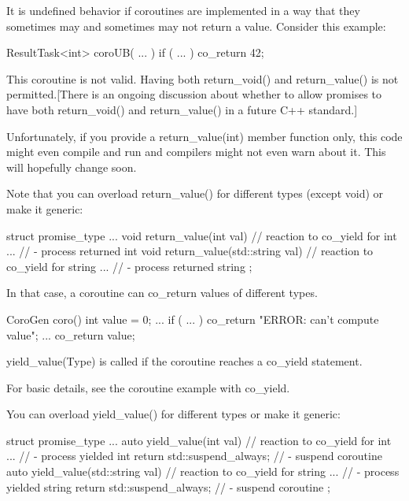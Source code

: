 It is undefined behavior if coroutines are implemented in a way that they sometimes may and sometimes may not return a value. Consider this example:

\begin{cpp}
ResultTask<int> coroUB( ... )
{
	if ( ... ) {
		co_return 42;
	}
}
\end{cpp}

This coroutine is not valid. Having both return\_void() and return\_value() is not permitted.[There is an ongoing discussion about whether to allow promises to have both return\_void() and return\_value() in a future C++ standard.]

Unfortunately, if you provide a return\_value(int) member function only, this code might even compile and run and compilers might not even warn about it. This will hopefully change soon.

Note that you can overload return\_value() for different types (except void) or make it generic:

\begin{cpp}
struct promise_type {
	...
	void return_value(int val) { // reaction to co_yield for int
		... // - process returned int
	}
	void return_value(std::string val) { // reaction to co_yield for string
		... // - process returned string
	}
};
\end{cpp}

In that case, a coroutine can co\_return values of different types.

\begin{cpp}
CoroGen coro()
{
	int value = 0;
	...
	if ( ... ) {
		co_return "ERROR: can't compute value";
	}
	...
	co_return value;
}
\end{cpp}


yield\_value(Type) is called if the coroutine reaches a co\_yield statement.

For basic details, see the coroutine example with co\_yield.

You can overload yield\_value() for different types or make it generic:

\begin{cpp}
struct promise_type {
	...
	auto yield_value(int val) { // reaction to co_yield for int
		... // - process yielded int
		return std::suspend_always{}; // - suspend coroutine
	}
	auto yield_value(std::string val) { // reaction to co_yield for string
		... // - process yielded string
		return std::suspend_always{}; // - suspend coroutine
	}
};
\end{cpp}

